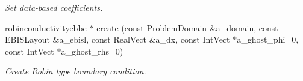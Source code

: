 \begin{DoxyCompactItemize}
\begin{DoxyCompactList}\small\item\em Set data-\/based coefficients. \end{DoxyCompactList}\item 
\hyperlink{classrobinconductivityebbc}{robinconductivityebbc} $\ast$ \hyperlink{classrobinconductivityebbcfactory_a4d62ab0fccb81f328f0e935d2eef1bbf}{create} (const Problem\+Domain \&a\+\_\+domain, const E\+B\+I\+S\+Layout \&a\+\_\+ebisl, const Real\+Vect \&a\+\_\+dx, const Int\+Vect $\ast$a\+\_\+ghost\+\_\+phi=0, const Int\+Vect $\ast$a\+\_\+ghost\+\_\+rhs=0)
\begin{DoxyCompactList}\small\item\em Create Robin type boundary condition. \end{DoxyCompactList}\end{DoxyCompactItemize}
